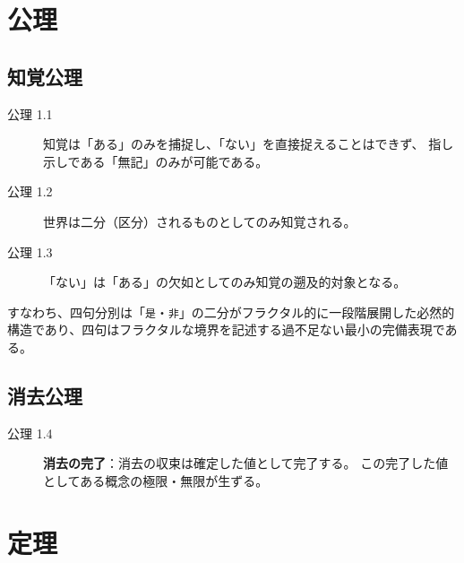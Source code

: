 \documentclass[11pt,a4paper]{ltjsarticle}
\begin{document}
\section{公理}

\subsection{知覚公理}
\begin{description}
  \item[公理 1.1] 知覚は「ある」のみを捕捉し、「ない」を直接捉えることはできず、
  指し示しである「無記」のみが可能である。
  \item[公理 1.2] 世界は二分（区分）されるものとしてのみ知覚される。
  \item[公理 1.3] 「ない」は「ある」の欠如としてのみ知覚の遡及的対象となる。
\end{description}

すなわち、四句分別は「\texttt{是}・\texttt{非}」の二分がフラクタル的に一段階展開した必然的構造であり、四句はフラクタルな境界を記述する過不足ない最小の完備表現である。

\subsection{消去公理}
\begin{description}
  \item[公理 1.4] \textbf{消去の完了}：消去の収束は確定した値として完了する。
  この完了した値としてある概念の極限・無限が生ずる。
\end{description}

\section{定理}
\end{document}
